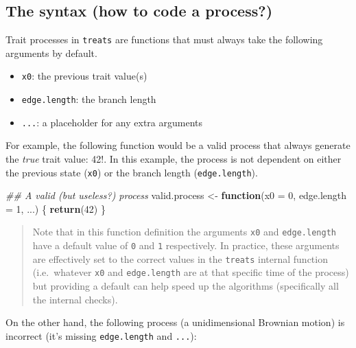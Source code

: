 \documentclass[
]{book}
\newenvironment{Shaded}{\begin{snugshade}}{\end{snugshade}}
\newcommand{\CommentTok}[1]{\textcolor[rgb]{0.56,0.35,0.01}{\textit{#1}}}
\newcommand{\ControlFlowTok}[1]{\textcolor[rgb]{0.13,0.29,0.53}{\textbf{#1}}}
\newcommand{\DataTypeTok}[1]{\textcolor[rgb]{0.13,0.29,0.53}{#1}}
\newcommand{\DecValTok}[1]{\textcolor[rgb]{0.00,0.00,0.81}{#1}}
\newcommand{\KeywordTok}[1]{\textcolor[rgb]{0.13,0.29,0.53}{\textbf{#1}}}
\newcommand{\NormalTok}[1]{#1}
\newcommand{\StringTok}[1]{\textcolor[rgb]{0.31,0.60,0.02}{#1}}
\providecommand{\tightlist}{%
  \setlength{\itemsep}{0pt}\setlength{\parskip}{0pt}}
\begin{document}
\hypertarget{the-syntax-how-to-code-a-process}{%
\subsection{The syntax (how to code a process?)}\label{the-syntax-how-to-code-a-process}}

Trait processes in \texttt{treats} are functions that must always take the following arguments by default.

\begin{itemize}
\tightlist
\item
  \texttt{x0}: the previous trait value(s)
\item
  \texttt{edge.length}: the branch length
\item
  \texttt{...}: a placeholder for any extra arguments
\end{itemize}

For example, the following function would be a valid process that always generate the \emph{true} trait value: 42!.
In this example, the process is not dependent on either the previous state (\texttt{x0}) or the branch length (\texttt{edge.length}).

\begin{Shaded}
\begin{Highlighting}[]
\CommentTok{\#\# A valid (but useless?) process}
\NormalTok{valid.process \textless{}{-}}\StringTok{ }\ControlFlowTok{function}\NormalTok{(}\DataTypeTok{x0 =} \DecValTok{0}\NormalTok{, }\DataTypeTok{edge.length =} \DecValTok{1}\NormalTok{, ...) \{}
    \KeywordTok{return}\NormalTok{(}\DecValTok{42}\NormalTok{)}
\NormalTok{\}}
\end{Highlighting}
\end{Shaded}

\begin{quote}
Note that in this function definition the arguments \texttt{x0} and \texttt{edge.length} have a default value of \texttt{0} and \texttt{1} respectively. In practice, these arguments are effectively set to the correct values in the \texttt{treats} internal function (i.e.~whatever \texttt{x0} and \texttt{edge.length} are at that specific time of the process) but providing a default can help speed up the algorithms (specifically all the internal checks).
\end{quote}

On the other hand, the following process (a unidimensional Brownian motion) is incorrect (it's missing \texttt{edge.length} and \texttt{...}):
\end{document}
